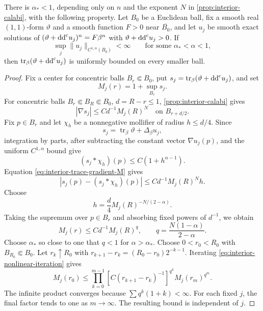 \begin{proposition}\label{prop:interior-c1a-to-trace}
There is $\alpha_*<1$, depending only on $n$ and the exponent $N$ in \cref{prop:interior-calabi}, with the following property. Let $B_0$ be a Euclidean ball, fix a smooth real $(1,1)$-form $\vartheta$ and a smooth function $F>0$ near $\overline{B_0}$, and let $u_j$ be smooth exact solutions of $(\vartheta+\mathrm{dd}^{\mathrm{c}} u_j)^n=F\beta^n$ with $\vartheta+\mathrm{dd}^{\mathrm{c}} u_j>0$. If
\[
  \sup_j\lVert u_j\rVert_{C^{1,\alpha}(B_0)}<\infty
  \qquad\text{for some }\alpha_*<\alpha<1,
\]
then $\operatorname{tr}_\beta(\vartheta+\mathrm{dd}^{\mathrm{c}} u_j)$ is uniformly bounded on every smaller ball.
\end{proposition}

\begin{proof}
Fix a center for concentric balls $B_r\Subset B_0$, put $s_j=\operatorname{tr}_\beta(\vartheta+\mathrm{dd}^{\mathrm{c}} u_j)$, and set
\[
  M_j(r)=1+\sup_{B_r}s_j.
\]
For concentric balls $B_r\Subset B_R\Subset B_0$, $d=R-r\leq1$, \cref{prop:interior-calabi} gives
\begin{equation}\label{eq:interior-trace-gradient-M}
  |\nabla s_j|\leq Cd^{-1}M_j(R)^N
  \quad\text{on }B_{r+d/2}.
\end{equation}
Fix $p\in B_r$ and let $\chi_h$ be a nonnegative mollifier of radius $h\leq d/4$. Since
\[
  s_j=\operatorname{tr}_\beta\vartheta+\Delta_\beta u_j,
\]
integration by parts, after subtracting the constant vector $\nabla u_j(p)$, and the uniform $C^{1,\alpha}$ bound give
\[
  (s_j*\chi_h)(p)\leq C(1+h^{\alpha-1}).
\]
Equation \eqref{eq:interior-trace-gradient-M} gives
\[
  |s_j(p)-(s_j*\chi_h)(p)|
  \leq Cd^{-1}M_j(R)^Nh.
\]
Choose
\[
  h=\frac d4M_j(R)^{-N/(2-\alpha)}.
\]
Taking the supremum over $p\in B_r$ and absorbing fixed powers of $d^{-1}$, we obtain
\begin{equation}\label{eq:interior-nonlinear-iteration}
  M_j(r)\leq Cd^{-1}M_j(R)^q,
  \qquad
  q=\frac{N(1-\alpha)}{2-\alpha}.
\end{equation}
Choose $\alpha_*$ so close to one that $q<1$ for $\alpha>\alpha_*$. Choose $0<r_0<R_0$ with $B_{R_0}\Subset B_0$. Let $r_k\uparrow R_0$ with $r_{k+1}-r_k=(R_0-r_0)2^{-k-1}$. Iterating \eqref{eq:interior-nonlinear-iteration} gives
\[
  M_j(r_0)
  \leq
  \prod_{k=0}^{m-1}\left[C(r_{k+1}-r_k)^{-1}\right]^{q^k}
  M_j(r_m)^{q^m}.
\]
The infinite product converges because $\sum q^k(1+k)<\infty$. For each fixed $j$, the final factor tends to one as $m\to\infty$. The resulting bound is independent of $j$.
\end{proof}

